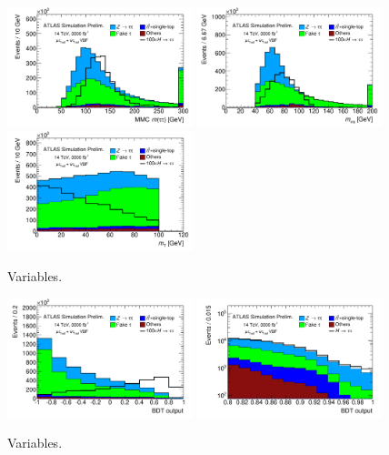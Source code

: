 \begin{figure}[!htpb]
  \includegraphics[width=0.48\textwidth]{figures/ATL-PHYS-PUB-2014-018/fig_04f}
  \includegraphics[width=0.48\textwidth]{figures/ATL-PHYS-PUB-2014-018/fig_04g}
  \includegraphics[width=0.48\textwidth]{figures/ATL-PHYS-PUB-2014-018/fig_04h}
  \caption{Variables.}
  \label{fig:prospects-hllhc-taus}
\end{figure}

\begin{figure}[!htpb]
  \centering
  \includegraphics[width=0.48\textwidth]{figures/ATL-PHYS-PUB-2014-018/fig_06a}
  \includegraphics[width=0.48\textwidth]{figures/ATL-PHYS-PUB-2014-018/fig_06b}
  \caption{Variables.}
  \label{fig:prospects-hllhc-bdts}
\end{figure}

